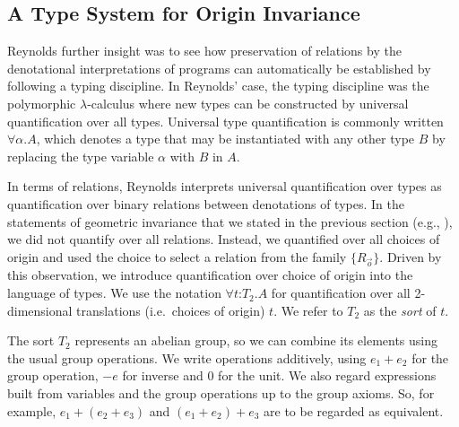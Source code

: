 
\subsection{A Type System for Origin Invariance}
\label{sec:type-system-geom-intro}

Reynolds further insight was to see how preservation of relations by
the denotational interpretations of programs can automatically be
established by following a typing discipline. In Reynolds' case, the
typing discipline was the polymorphic $\lambda$-calculus where new
types can be constructed by universal quantification over all
types. Universal type quantification is commonly written $\forall
\alpha. A$, which denotes a type that may be instantiated with any
other type $B$ by replacing the type variable $\alpha$ with $B$ in
$A$.

In terms of relations, Reynolds interprets universal quantification
over types as quantification over binary relations between denotations
of types. In the statements of geometric invariance that we stated in
the previous section (e.g., ), we
did not quantify over all relations. Instead, we quantified over all
choices of origin and used the choice to select a relation from the
family $\{R_{\vec{o}}\}$. Driven by this observation, we introduce
quantification over choice of origin into the language of types.  We
use the notation $\forall t \mathord: T_2. A$ for quantification over
all 2-dimensional translations (i.e.~choices of origin) $t$. We refer
to $T_2$ as the \emph{sort} of $t$.


The sort $T_2$ represents an abelian group, so we can combine its
elements using the usual group operations. We write operations
additively, using $e_1 + e_2$ for the group operation, $-e$ for
inverse and $0$ for the unit.  We also regard expressions built from
variables and the group operations up to the group axioms. So, for
example, $e_1 + (e_2 + e_3)$ and $(e_1 + e_2) + e_3$ are to be
regarded as equivalent.

